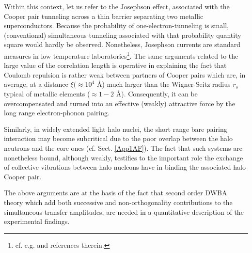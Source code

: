 Within this context, let us refer to the Josephson effect, associated with the Cooper pair tunneling across a thin barrier separating two metallic superconductors. Because the probability of one-electron-tunneling is small, (conventional) simultaneous tunneling associated with that probability quantity square would hardly be observed. Nonetheless, Josephson currents are standard measures in low temperature laboratories\footnote{cf. e.g. \cite{Rogalla:12} and references therein.}.
The same arguments related  to the large value of the correlation length is operative in explaining the fact that Coulomb repulsion is rather weak between partners of Cooper pairs which are, in average, at a distance $\xi (\approx 10^{4}$ \AA{}) much larger than the Wigner-Seitz radius $r_s$ typical of metallic elements ($\approx 1-2$ \AA{}). Consequently, it can be overcompensated and turned into an effective (weakly) attractive force by the long range electron-phonon pairing. 


Similarly, in widely extended light halo nuclei, the short range bare pairing interaction may  become subcritical due to the poor overlap between the halo neutrons and the core ones (cf. Sect. \ref{App1AF}). The fact that such systems are nonetheless bound, although weakly, testifies to the important role the exchange of collective vibrations between halo nucleons have in binding the associated halo Cooper pair.


The above arguments are at the basis of the fact that second order DWBA theory which add both successive 
 and non-orthogonality contributions to the simultaneous transfer amplitudes, are needed in a quantitative description of the experimental findings.

